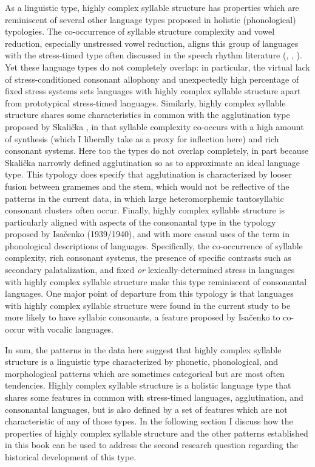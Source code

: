   As a linguistic type, highly complex syllable structure has properties which are reminiscent of several other language types proposed in holistic (phonological) typologies. The co-occurrence of syllable structure complexity and vowel reduction, especially unstressed vowel reduction, aligns this group of languages with the stress-timed type often discussed in the speech rhythm literature (\citealt{Dauer1983}, \citealt{Auer1993}, \citealt{Schiering2007}). Yet these language types do not completely overlap: in particular, the virtual lack of stress-conditioned consonant allophony and unexpectedly high percentage of fixed stress systems sets languages with highly complex syllable structure apart from prototypical stress-timed languages. Similarly, highly complex syllable structure shares some characteristics in common with the agglutination type proposed by Skalička , in that syllable complexity co-occurs with a high amount of synthesis (which I liberally take as a proxy for inflection here) and rich consonant systems. Here too the types do not overlap completely, in part because Skalička narrowly defined agglutination so as to approximate an ideal language type. This typology does specify that agglutination is characterized by looser fusion between gramemes and the stem, which would not be reflective of the patterns in the current data, in which large heteromorphemic tautosyllabic consonant clusters often occur. Finally, highly complex syllable structure is particularly aligned with aspects of the consonantal type in the typology proposed by Isačenko (1939/1940), and with more casual uses of the term in phonological descriptions of languages. Specifically, the co-occurrence of syllable complexity, rich consonant systems, the presence of specific contrasts such as secondary palatalization, and fixed \textit{or} lexically-determined stress in languages with highly complex syllable structure make this type reminiscent of consonantal languages. One major point of departure from this typology is that languages with highly complex syllable structure were found in the current study to be more likely to have syllabic consonants, a feature proposed by Isačenko to co-occur with vocalic languages.



  In sum, the patterns in the data here suggest that highly complex syllable structure is a linguistic type characterized by phonetic, phonological, and morphological patterns which are sometimes categorical but are most often tendencies. Highly complex syllable structure is a holistic language type that shares some features in common with stress-timed languages, agglutination, and consonantal languages, but is also defined by a set of features which are not characteristic of any of those types. In the following section I discuss how the properties of highly complex syllable structure and the other patterns established in this book can be used to address the second research question regarding the historical development of this type.



